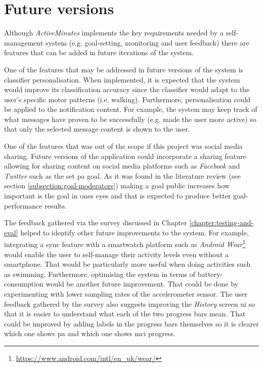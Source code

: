 \section{Future versions}
Although \textit{ActiveMinutes} implements the key requirements needed by a self-management system (e.g. goal-setting, monitoring and user feedback) there are features that can be added in future iterations of the system. 

One of the features that may be addressed in future versions of the system is classifier personalisation. When implemented, it is expected that the system would improve its classification accuracy since the classifier would adapt to the user's specific motor patterns (i.e. walking). Furthermore, personalisation could be applied to the notification content. For example, the system may keep track of what messages have proven to be successfully (e.g. made the user more active) so that only the selected message content is shown to the user.

One of the features that was out of the scope if this project was social media sharing. Future versions of the application could incorporate a sharing feature allowing for sharing content on social media platforms such as \textit{Facebook} and \textit{Twitter} such as the set \gls{pa} goal. As it was found in the literature review (see section \ref{subsection:goal-moderators}) making a goal public increases how important is the goal in ones eyes and that is expected to produce better goal-performance results. 

The feedback gathered via the survey discussed in Chapter \ref{chapter:testing-and-eval} helped to identify other future improvements to the system. For example, integrating a sync feature with a smartwatch platform such as \textit{Android Wear}\footnote{\url{https://www.android.com/intl/en_uk/wear/}} would enable the user to self-manage their activity levels even without a smartphone. That would be particularly more useful when doing activities such as swimming. Furthermore, optimising the system in terms of battery-consumption would be another future improvement. That could be done by experimenting with lower sampling rates of the accelerometer sensor. The user feedback gathered by the survey also suggests improving the \textit{History} screen \gls{ui} so that it is easier to understand what each of the two progress bars mean. That could be improved by adding labels in the progress bars themselves so it is clearer which one shows \gls{pa} and which one shows \gls{mci} progress.

